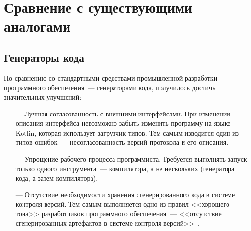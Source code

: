 \section{Сравнение с существующими аналогами}


\subsection{Генераторы кода}\label{res:generators}
По сравнению со стандартными средствами промышленной разработки программного обеспечения~--- генераторами кода,
получилось достичь значительных улучшений:
\begin{itemize}
	\item[---] Лучшая согласованность с внешними интерфейсами. При изменении описания интерфейса невозможно забыть изменить программу на языке Kotlin, которая использует загрузчик типов. Тем самым изводится один из типов ошибок~--- несогласованность версий протокола и его описания.
	\item[---] Упрощение рабочего процесса программиста. Требуется выполнять запуск только одного инструмента~--- компилятора, а не нескольких (генератора кода, а затем компилятора).
	\item[---] Отсутствие необходимости хранения сгенерированного кода в системе контроля версий. Тем самым выполняется одно из правил <<хорошего тона>> разработчиков программного обеспечения~--- <<отсутствие сгенерированных артефактов в системе контроля версий>>~\cite{art-of-agile}.
\end{itemize}

